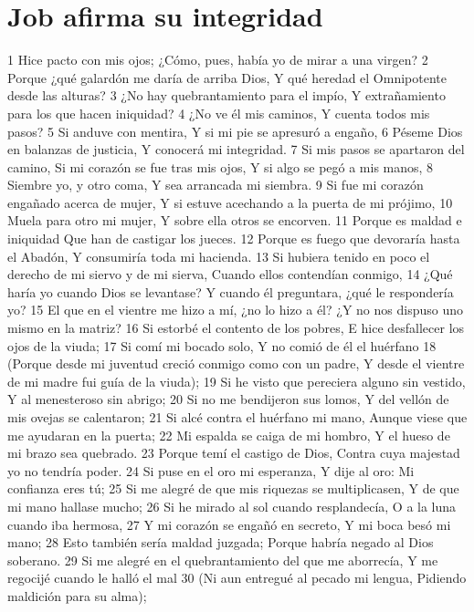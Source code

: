 \section*{Job afirma su integridad}

1 Hice pacto con mis ojos;
¿Cómo, pues, había yo de mirar a una virgen?
2 Porque ¿qué galardón me daría de arriba Dios,
Y qué heredad el Omnipotente desde las alturas?
3 ¿No hay quebrantamiento para el impío,
Y extrañamiento para los que hacen iniquidad?
4 ¿No ve él mis caminos,
Y cuenta todos mis pasos?
5 Si anduve con mentira,
Y si mi pie se apresuró a engaño,
6 Péseme Dios en balanzas de justicia,
Y conocerá mi integridad.
7 Si mis pasos se apartaron del camino,
Si mi corazón se fue tras mis ojos,
Y si algo se pegó a mis manos,
8 Siembre yo, y otro coma,
Y sea arrancada mi siembra.
9 Si fue mi corazón engañado acerca de mujer,
Y si estuve acechando a la puerta de mi prójimo, 
10 Muela para otro mi mujer,
Y sobre ella otros se encorven.
11 Porque es maldad e iniquidad
Que han de castigar los jueces.
12 Porque es fuego que devoraría hasta el Abadón,
Y consumiría toda mi hacienda.
13 Si hubiera tenido en poco el derecho de mi siervo y de mi sierva,
Cuando ellos contendían conmigo,
14 ¿Qué haría yo cuando Dios se levantase?
Y cuando él preguntara, ¿qué le respondería yo?
15 El que en el vientre me hizo a mí, ¿no lo hizo a él?
¿Y no nos dispuso uno mismo en la matriz?
16 Si estorbé el contento de los pobres,
E hice desfallecer los ojos de la viuda;
17 Si comí mi bocado solo,
Y no comió de él el huérfano
18 (Porque desde mi juventud creció conmigo como con un padre,
Y desde el vientre de mi madre fui guía de la viuda);
19 Si he visto que pereciera alguno sin vestido,
Y al menesteroso sin abrigo;
20 Si no me bendijeron sus lomos,
Y del vellón de mis ovejas se calentaron;
21 Si alcé contra el huérfano mi mano,
Aunque viese que me ayudaran en la puerta;
22 Mi espalda se caiga de mi hombro,
Y el hueso de mi brazo sea quebrado.
23 Porque temí el castigo de Dios,
Contra cuya majestad yo no tendría poder.
24 Si puse en el oro mi esperanza,
Y dije al oro: Mi confianza eres tú;
25 Si me alegré de que mis riquezas se multiplicasen,
Y de que mi mano hallase mucho;
26 Si he mirado al sol cuando resplandecía,
O a la luna cuando iba hermosa,
27 Y mi corazón se engañó en secreto,
Y mi boca besó mi mano;
28 Esto también sería maldad juzgada;
Porque habría negado al Dios soberano.
29 Si me alegré en el quebrantamiento del que me aborrecía,
Y me regocijé cuando le halló el mal
30 (Ni aun entregué al pecado mi lengua,
Pidiendo maldición para su alma);
